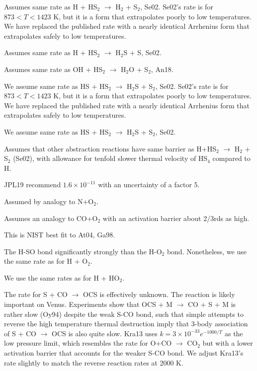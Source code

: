 \documentclass[12pt,landscape]{article}
\newcounter{reaction}
\begin{document}
  Assumes same rate as H + HS$_2$ $\rightarrow$ H$_2$ + S$_2$, Se02.  Se02's rate is for $873<T<1423$ K,
but it is a form that extrapolates poorly to low temperatures.  We have replaced the published rate with a nearly identical Arrhenius form that extrapolates safely to low temperatures.  

 Assumes same rate as H + HS$_2$ $\rightarrow$ H$_2$S + S, Se02.  

  Assumes same rate as OH + HS$_2$ $\rightarrow$ H$_2$O + S$_2$, An18.

  We assume same rate as HS + HS$_2$ $\rightarrow$ H$_2$S + S$_2$, Se02.
 Se02's rate is for $873<T<1423$ K, but it is a form that extrapolates poorly to low temperatures.  We have replaced the published rate with a nearly identical Arrhenius form that extrapolates safely to low temperatures.

 We assume same rate as HS + HS$_2$ $\rightarrow$ H$_2$S + S$_2$, Se02.

  Assumes that other abstraction reactions have same barrier as H+HS$_2$ $\rightarrow$ H$_2$ + S$_2$ (Se02),
with allowance for tenfold slower thermal velocity of HS$_4$ compared to H.

  JPL19 recommend $1.6\times 10^{-11}$ with an uncertainty of a factor 5.

  Assumed by analogy to N+O$_2$.

    Assumes an analogy to CO+O$_2$ with an activation barrier about 2/3rds as high.
 
    This is NIST best fit to At04, Ga98.
  
 The H-SO bond significantly strongly than the H-O$_2$ bond.
 Nonetheless, we use the same rate as for H + O$_2$.  %

 We use the same rates as for H + HO$_2$.  %

 The rate for S + CO $\rightarrow$ OCS is effectively unknown.  The reaction is likely important on Venus.
Experiments show that OCS + M $\rightarrow$ CO + S + M is rather slow (Oy94) despite the weak S-CO bond, such 
that simple attempts to reverse the high temperature thermal destruction imply that 3-body association of S + CO $\rightarrow$ OCS is also quite slow.
Kra13 uses $k=3\times 10^{-33}e^{-1000/T}$ as the low pressure limit, which resembles the rate for O+CO $\rightarrow$ CO$_2$ but with a lower activation barrier that accounts for the weaker S-CO bond.
We adjust Kra13's rate slightly to match the reverse reaction rates at 2000 K.
\end{document}
